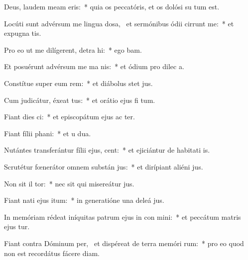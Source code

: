 \item Deus, laudem meam  eris:~* quia os peccatóris, et os dolósi su  tum est.
\item Locúti sunt advérsum me lingua dosa,~\pscross{} et sermónibus ódii cirrunt me:~* et expugna  tis.
\item Pro eo ut me dilígerent, detra hi:~* ego  bam.
\item Et posuérunt advérsum me ma  nis:~* et ódium pro dilec a.
\item Constítue super eum rem:~* et diábolus stet   jus.
\item Cum judicátur, éxeat tus:~* et orátio ejus fi  tum.
\item Fiant dies  ci:~* et episcopátum ejus ac ter.
\item Fiant fílii  phani:~* et u  dua.
\item Nutántes transferántur fílii ejus,  cent:~* et ejiciántur de habitati is.
\item Scrutétur fœnerátor omnem substán jus:~* et dirípiant aliéni  jus.
\item Non sit il tor:~* nec sit qui misereátur  jus.
\item Fiant nati ejus  itum:~* in generatióne una deleá  jus.
\item In memóriam rédeat iníquitas patrum ejus in con mini:~* et peccátum matris ejus  tur.
\item Fiant contra Dóminum per,~\pscross{} et dispéreat de terra memóri rum:~* pro eo quod non est recordátus fácere diam.
